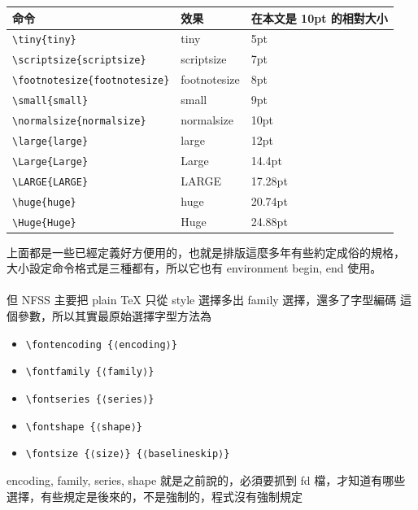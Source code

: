   \begin{center}
    \begin{tabular}[t]{lll}
      命令 & 效果 & 在本文是 10pt 的相對大小 \\
      \hline
      \hline
      \verb=\tiny{tiny}= & \tiny{tiny} & 5pt \\
      \verb=\scriptsize{scriptsize}= & \scriptsize{scriptsize} & 7pt \\
      \verb=\footnotesize{footnotesize}= & \footnotesize{footnotesize} & 8pt \\
      \verb=\small{small}= & \small{small} & 9pt \\
      \verb=\normalsize{normalsize}= & \normalsize{normalsize} & 10pt \\
      \verb=\large{large}= & \large{large} & 12pt \\
      \verb=\Large{Large}= & \Large{Large} & 14.4pt \\
      \verb=\LARGE{LARGE}= & \LARGE{LARGE} & 17.28pt \\
      \verb=\huge{huge}= & \huge{huge} & 20.74pt \\
      \verb=\Huge{Huge}= & \Huge{Huge} & 24.88pt \\
    \end{tabular}
  \end{center}
  上面都是一些已經定義好方便用的，也就是排版這麼多年有些約定成俗的規格，
  大小設定命令格式是三種都有，所以它也有 environment begin, end 使用。
  \\\\
  但 NFSS 主要把 plain \TeX{} 只從 style 選擇多出 family 選擇，還多了字型編碼
  這個參數，所以其實最原始選擇字型方法為
  \begin{itemize}
    \item \verb=\fontencoding {⟨encoding⟩}=
    \item \verb=\fontfamily {⟨family⟩}=
    \item \verb=\fontseries {⟨series⟩}=
    \item \verb=\fontshape {⟨shape⟩}=
    \item \verb=\fontsize {⟨size⟩} {⟨baselineskip⟩}=
  \end{itemize}
  encoding, family, series, shape 就是之前說的，必須要抓到 fd 檔，才知道有哪些
  選擇，有些規定是後來的，不是強制的，程式沒有強制規定
